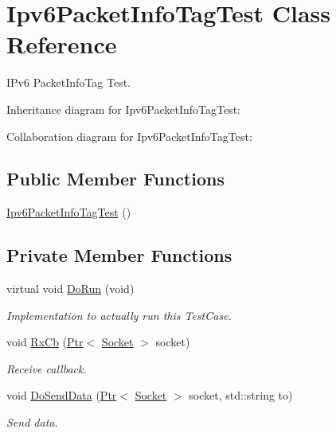 \hypertarget{classIpv6PacketInfoTagTest}{}\section{Ipv6\+Packet\+Info\+Tag\+Test Class Reference}
\label{classIpv6PacketInfoTagTest}


I\+Pv6 Packet\+Info\+Tag Test.  




Inheritance diagram for Ipv6\+Packet\+Info\+Tag\+Test\+:


Collaboration diagram for Ipv6\+Packet\+Info\+Tag\+Test\+:
\subsection*{Public Member Functions}
\begin{DoxyCompactItemize}
\item 
\hyperlink{classIpv6PacketInfoTagTest_a8f298d8e4a044c024f9abf0c2a76b640}{Ipv6\+Packet\+Info\+Tag\+Test} ()
\end{DoxyCompactItemize}
\subsection*{Private Member Functions}
\begin{DoxyCompactItemize}
\item 
virtual void \hyperlink{classIpv6PacketInfoTagTest_a6b51aaddc63d2aaef95b72056cb5b36d}{Do\+Run} (void)
\begin{DoxyCompactList}\small\item\em Implementation to actually run this Test\+Case. \end{DoxyCompactList}\item 
void \hyperlink{classIpv6PacketInfoTagTest_a71bf0b1c87d70945d55fa28995a18db0}{Rx\+Cb} (\hyperlink{classns3_1_1Ptr}{Ptr}$<$ \hyperlink{classns3_1_1Socket}{Socket} $>$ socket)
\begin{DoxyCompactList}\small\item\em Receive callback. \end{DoxyCompactList}\item 
void \hyperlink{classIpv6PacketInfoTagTest_ab880bf3bb45b329560c08666ed9aa16d}{Do\+Send\+Data} (\hyperlink{classns3_1_1Ptr}{Ptr}$<$ \hyperlink{classns3_1_1Socket}{Socket} $>$ socket, std\+::string to)
\begin{DoxyCompactList}\small\item\em Send data. \end{DoxyCompactList}\end{DoxyCompactItemize}
